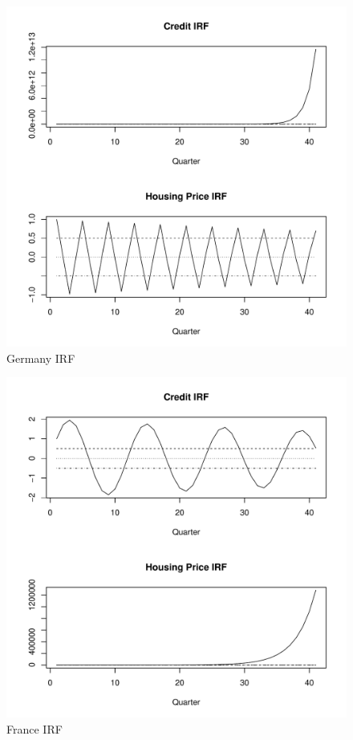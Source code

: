 \documentclass[fleqn]{article}
\begin{document}
\begin{outline}[enumerate]
\begin{figure}[h!]
	\caption{Germany IRF}	
	\centerline{\includegraphics[scale=0.7]{../Output/Graphs/IRF_DE.pdf}}
\end{figure}

\begin{figure}[h!]
	\caption{France IRF}	
	\centerline{\includegraphics[scale=0.7]{../Output/Graphs/IRF_FR.pdf}}
\end{figure}


\end{outline}
\end{document}

